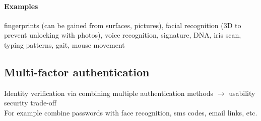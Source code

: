 \documentclass[12pt]{article}
\begin{document}
	\paragraph{Examples} fingerprints (can be gained from surfaces, pictures), facial recognition (3D to prevent unlocking with photos), voice recognition, signature, DNA, iris scan, typing patterns, gait, mouse movement
	
	\subsection{Multi-factor authentication}
	Identity verification via combining multiple authentication methods $\rightarrow$ usability security trade-off\\
	For example combine passwords with face recognition, sms codes, email links, etc.
	
	
\end{document}
